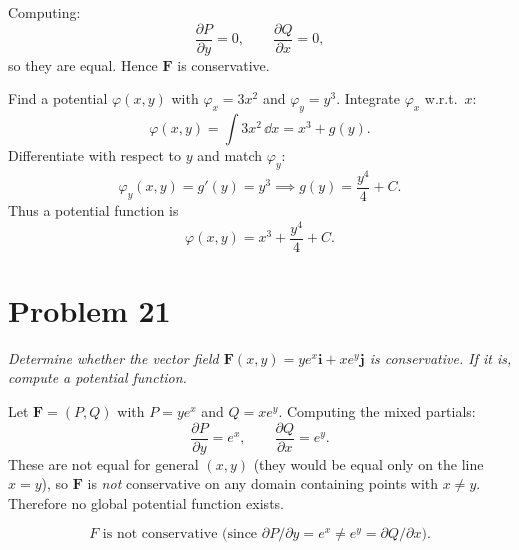 \documentclass[12pt]{memoir}
\begin{document}
Computing:
\[
\frac{\partial P}{\partial y}=0,\qquad
\frac{\partial Q}{\partial x}=0,
\]
so they are equal. Hence \(\mathbf F\) is conservative.

Find a potential \(\varphi(x,y)\) with \(\varphi_x=3x^2\) and \(\varphi_y=y^3\). Integrate \(\varphi_x\) w.r.t.\ \(x\):
\[
\varphi(x,y)=\int 3x^2\,\dd x = x^3 + g(y).
\]
Differentiate with respect to \(y\) and match \(\varphi_y\):
\[
\varphi_y(x,y)=g'(y)=y^3 \implies g(y)=\frac{y^4}{4}+C.
\]
Thus a potential function is
\[
\boxed{\displaystyle \varphi(x,y)=x^3+\frac{y^4}{4}+C.}
\]

\section*{Problem 21}
\textit{Determine whether the vector field \(\mathbf F(x,y)=y e^{x}\mathbf i + x e^{y}\mathbf j\) is conservative. If it is, compute a potential function.}

Let \(\mathbf F=\left( P,Q\right)\) with \(P=y e^{x}\) and \(Q=x e^{y}\). Computing the mixed partials:
\[
\frac{\partial P}{\partial y}=e^{x},\qquad
\frac{\partial Q}{\partial x}=e^{y}.
\]
These are not equal for general \((x,y)\) (they would be equal only on the line \(x=y\)), so \(\mathbf F\) is \emph{not} conservative on any domain containing points with \(x\neq y\). Therefore no global potential function exists.

\[
\boxed{F\text{ is not conservative (since } \partial P/\partial y = e^{x} \ne e^{y} = \partial Q/\partial x\text{).}}
\]
\end{document}
